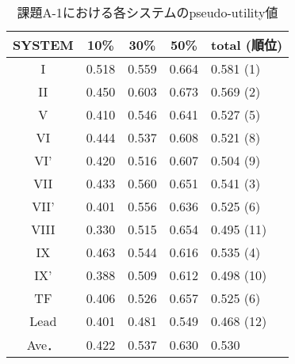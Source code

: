 \begin{table*}[t]
{\small
\caption{課題A-1における各システムのpseudo-utility値\label{table:aefscore2}}
\begin{center}
\begin{tabular}{|c||c|c|c|||l|}\hline
SYSTEM & 10\%  & 30\%  & 50\%  & total (順位)\\ \hline\hline
I      & 0.518 & 0.559 & 0.664 & 0.581 (1)\\ \hline 
II     & 0.450 & 0.603 & 0.673 & 0.569 (2)\\ \hline 
V      & 0.410 & 0.546 & 0.641 & 0.527 (5)\\ \hline 
VI     & 0.444 & 0.537 & 0.608 & 0.521 (8)\\ \hline 
VI'    & 0.420 & 0.516 & 0.607 & 0.504 (9)\\ \hline 
VII    & 0.433 & 0.560 & 0.651 & 0.541 (3)\\ \hline 
VII'   & 0.401 & 0.556 & 0.636 & 0.525 (6)\\ \hline 
VIII   & 0.330 & 0.515 & 0.654 & 0.495 (11)\\ \hline 
IX     & 0.463 & 0.544 & 0.616 & 0.535 (4)\\ \hline 
IX'    & 0.388 & 0.509 & 0.612 & 0.498 (10)\\ \hline 
TF     & 0.406 & 0.526 & 0.657 & 0.525 (6)\\ \hline 
Lead   & 0.401 & 0.481 & 0.549 & 0.468 (12)\\ \hline\hline 
Ave．  & 0.422 & 0.537 & 0.630 & 0.530 \\ \hline 
\end{tabular}
\end{center}
}
\end{table*}

